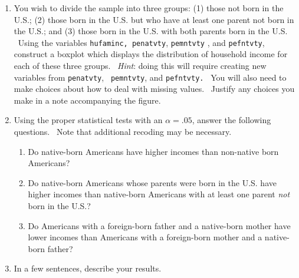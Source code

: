 \documentclass[11pt]{article}
\begin{document}
\begin{enumerate}
\begin{enumerate}
\item You wish to divide the sample into three groups: (1) those not born in
the U.S.; (2) those born in the U.S. but who have at least one parent not
born in the U.S.; and (3) those born in the U.S. with both parents born in
the U.S. \ Using the variables \texttt{hufaminc, penatvty}, \texttt{pemntvty}%
, and \texttt{pefntvty}, construct a boxplot which displays the distribution
of household income for each of these three groups. \ \textit{Hint}: doing
this will require creating new variables from \texttt{penatvty}, \texttt{%
pemntvty}, and \texttt{pefntvty.} \ You will also need to make choices about
how to deal with missing values. \ Justify any choices you make in a note
accompanying the figure.\bigskip

\item Using the proper statistical tests with an $\alpha =.05$, answer the
following questions. \ Note that additional recoding may be necessary.

\begin{enumerate}
\item Do native-born Americans have higher incomes than non-native born
Americans?

\item Do native-born Americans whose parents were born in the U.S. have
higher incomes than native-born Americans with at least one parent \textit{%
not }born in the U.S.?

\item Do Americans with a foreign-born father and a native-born mother have
lower incomes than Americans with a foreign-born mother and a native-born
father?\bigskip
\end{enumerate}

\item In a few sentences, describe your results. \ \texttt{\ \ }
\end{enumerate}
\end{enumerate}
\end{document}

